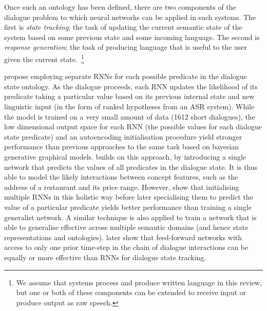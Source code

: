 \documentclass[11pt,letterpaper]{article}
\begin{document}
Once such an ontology has been defined, there are two components of the dialogue problem to which neural networks can be applied in such systems. The first is \emph{state tracking}; the task of updating the current semantic state of the system based on some previous state and some incoming language. The second is \emph{response generation}; the task of producing language that is useful to the user given the current state.~\footnote{We assume that systems process and produce written language in this review, but one or both of these components can be extended to receive input or produce output as raw speech.}

 propose employing separate RNNs for each possible predicate in the dialogue state ontology. As the dialogue proceeds, each RNN updates the likelihood of its predicate taking a particular value based on its previous internal state and new linguistic input (in the form of ranked hypotheses from an ASR system). While the model is trained on a very small amount of data (1612 short dialogues), the low dimensional output space for each RNN (the possible values for each dialogue state predicate) and an autoencoding initialisation procedure yield stronger performance than previous approaches to the same task based on bayesian generative graphical models.  builds on this approach, by introducing a single network that predicts the values of all predicates in the dialogue state. It is thus able to model the likely interactions between concept features, such as the address of a restaurant and its price range. However,  show that initialising multiple RNNs in this holistic way before later specialising them to predict the value of a particular predicate yields better performance than training a single generalist network. A similar technique is also applied to train a network that is able to generalise effective across multiple semantic domains (and hence state representations and ontologies).  later show that feed-forward networks with access to only one prior time-step in the chain of dialogue interactions can be equally or more effective than RNNs for dialogue state tracking. 
\end{document}
